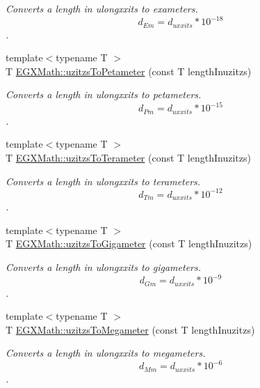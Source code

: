 \begin{DoxyCompactItemize}
\begin{DoxyCompactList}\small\item\em Converts a length in ulongxxits to exameters. \[ d_{Em}=d_{uxxits} * 10^{-18} \]. \end{DoxyCompactList}\item 
{\footnotesize template$<$typename T $>$ }\\T \mbox{\hyperlink{group___e_g_x_math-_conversions-_length_conversions-uzitzs-_s_i_gafe93d0226789fd78c2ffa4223eb6af7b}{E\+G\+X\+Math\+::uzitzs\+To\+Petameter}} (const T length\+Inuzitzs)
\begin{DoxyCompactList}\small\item\em Converts a length in ulongxxits to petameters. \[ d_{Pm}=d_{uxxits} * 10^{-15} \]. \end{DoxyCompactList}\item 
{\footnotesize template$<$typename T $>$ }\\T \mbox{\hyperlink{group___e_g_x_math-_conversions-_length_conversions-uzitzs-_s_i_gaed1a457a06ea3b69a4c63414b08b03a3}{E\+G\+X\+Math\+::uzitzs\+To\+Terameter}} (const T length\+Inuzitzs)
\begin{DoxyCompactList}\small\item\em Converts a length in ulongxxits to terameters. \[ d_{Tm}=d_{uxxits} * 10^{-12} \]. \end{DoxyCompactList}\item 
{\footnotesize template$<$typename T $>$ }\\T \mbox{\hyperlink{group___e_g_x_math-_conversions-_length_conversions-uzitzs-_s_i_ga15833fbe62cb7d741b808bc63a21df55}{E\+G\+X\+Math\+::uzitzs\+To\+Gigameter}} (const T length\+Inuzitzs)
\begin{DoxyCompactList}\small\item\em Converts a length in ulongxxits to gigameters. \[ d_{Gm}=d_{uxxits} * 10^{-9} \]. \end{DoxyCompactList}\item 
{\footnotesize template$<$typename T $>$ }\\T \mbox{\hyperlink{group___e_g_x_math-_conversions-_length_conversions-uzitzs-_s_i_ga237ffeef9137de3dd2cf5ae0eacf973e}{E\+G\+X\+Math\+::uzitzs\+To\+Megameter}} (const T length\+Inuzitzs)
\begin{DoxyCompactList}\small\item\em Converts a length in ulongxxits to megameters. \[ d_{Mm}=d_{uxxits} * 10^{-6} \]. \end{DoxyCompactList}\item 

\end{DoxyCompactItemize}
